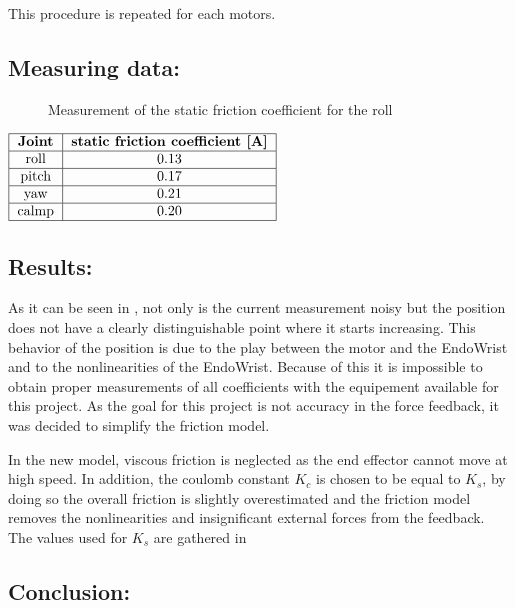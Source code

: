 This procedure is repeated for each motors.

\subsection*{Measuring data:}
\begin{figure}[H]
	\centering
	
	\caption{Measurement of the static friction coefficient for the roll}
	\label{fig:friction_measurement}
\end{figure}

\begin{center}
  $\begin{tabular}{|c|c|}
    \hline
    \textbf{Joint} & \textbf{static friction coefficient [A]} \\
    \hline
    roll & 0.13 \\
    \hline
    pitch & 0.17  \\
    \hline
    yaw & 0.21  \\
    \hline
    calmp & 0.20\\
    \hline
  \end{tabular}$
	\label{fig:static_friction_coefficient}
\end{center}
\subsection*{Results:}

As it can be seen in , not only is the current measurement noisy but the position does not have a clearly distinguishable point where it starts increasing. This behavior of the position is due to the play between the motor and the EndoWrist and to the nonlinearities of the EndoWrist. Because of this it is impossible to obtain proper measurements of all coefficients with the equipement available for this project. As the goal for this project is not accuracy in the force feedback, it was decided to simplify the friction model.

In the new model, viscous friction is neglected as the end effector cannot move at high speed. In addition, the coulomb constant $K_c$ is chosen to be equal to $K_s$, by doing so the overall friction is slightly overestimated and the friction model removes the nonlinearities and insignificant external forces from the feedback. The values used for $K_s$ are gathered in 
\subsection*{Conclusion:}

